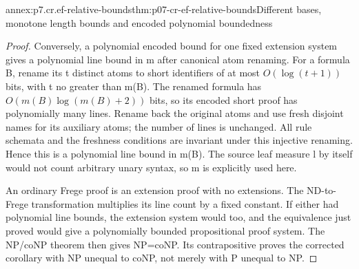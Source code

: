 \begin{annexitem}{annex:p7.cr.ef-relative-bounds}{thm:p07-cr-ef-relative-bounds}{Different bases, monotone length bounds and encoded polynomial boundedness}
\begin{proof}
Conversely, a polynomial encoded bound for one fixed extension
system gives a polynomial line bound in m after canonical atom
renaming. For a formula B, rename its t distinct atoms to short
identifiers of at most \(O(\log(t+1))\) bits, with t no greater
than m(B). The renamed formula has \(O(m(B)\log(m(B)+2))\)
bits, so its encoded short proof has polynomially many lines.
Rename back the original atoms and use fresh disjoint names
for its auxiliary atoms; the number of lines is unchanged.
All rule schemata and the freshness conditions are invariant
under this injective renaming. Hence this is a polynomial line
bound in m(B). The source leaf measure l by itself would not
count arbitrary unary syntax, so m is explicitly used here.

An ordinary Frege proof is an extension proof with no extensions.
The ND-to-Frege transformation multiplies its line count by a
fixed constant. If either had polynomial line bounds, the
extension system would too, and the equivalence just proved
would give a polynomially bounded propositional proof system.
The NP/coNP theorem then gives NP=coNP. Its contrapositive
proves the corrected corollary with NP unequal to coNP, not
merely with P unequal to NP.
\end{proof}
\end{annexitem}

